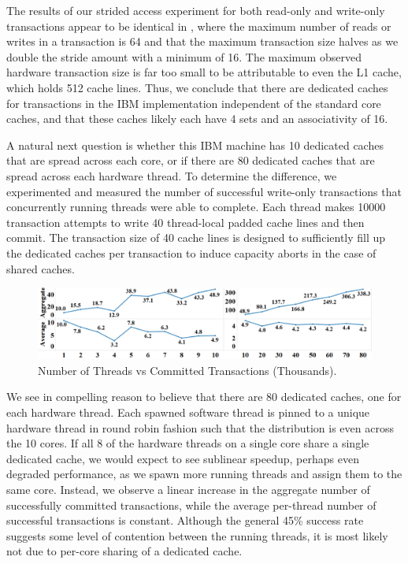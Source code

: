 The results of our strided access experiment for 
both read-only and write-only
transactions appear to be identical in
, where
the maximum number of reads or writes in a transaction
is 64 and that the maximum transaction size 
halves as we double the stride amount with a minimum
of 16.  The maximum observed hardware transaction size is far too
small to be attributable to even the {L1} cache, which holds 512 cache
lines.   Thus, we conclude that there are dedicated caches 
for transactions in the IBM implementation independent
of the standard core caches, and that
these caches likely each have 4 sets and an associativity of 16.


A natural next question is whether this IBM machine 
has 10 dedicated caches that
are spread across each core, or if there are 80 
dedicated caches that are spread
across each hardware thread. To determine the 
difference, we experimented and
measured the number of successful write-only 
transactions that concurrently
running threads were able to complete. Each 
thread makes 10000 transaction
attempts to write 40 thread-local padded cache 
lines and then commit. The
transaction size of 40 cache lines is designed 
to sufficiently fill up the
dedicated caches per transaction to induce capacity 
aborts in the case of shared
caches.

\begin{figure}[H]%
\centering
\includegraphics[width=\linewidth]{images/wttm_core_or_thread_ibm}
\caption{Number of Threads vs Committed Transactions (Thousands).}
\label{fig:wttm_core_or_thread_ibm}
\end{figure}


We see in  compelling 
reason to believe that
there are 80 dedicated caches, one for each hardware 
thread. Each spawned
software thread is pinned to a unique hardware thread 
in round robin fashion
such that the distribution is even across the 10 cores. 
If all 8 of the
hardware threads on a single core share a single 
dedicated cache, we would
expect to see sublinear speedup, perhaps even degraded 
performance, as we spawn
more running threads and assign them to the same core. 
Instead, we observe a
linear increase in the aggregate number of successfully 
committed transactions,
while the average per-thread number of successful 
transactions is constant.
Although the general 45\% success rate suggests some 
level of contention between
the running threads, it is most likely not due to 
per-core sharing of a
dedicated cache.
 
